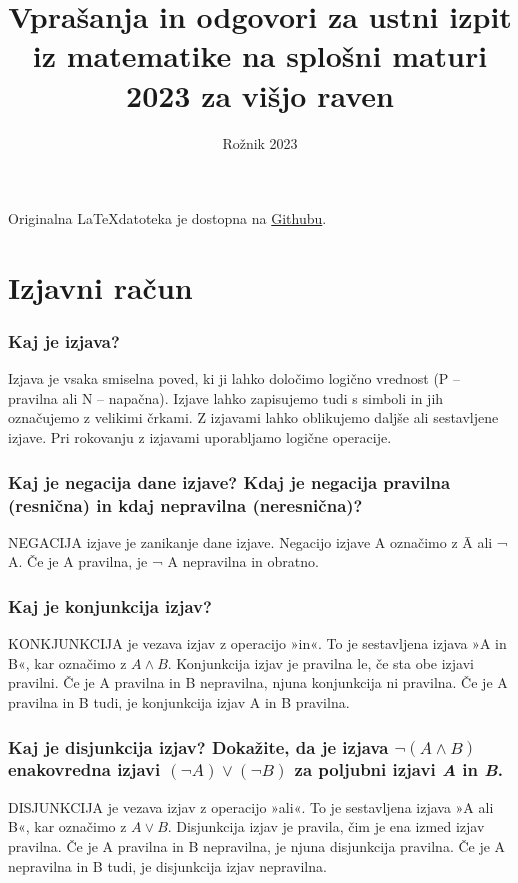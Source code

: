\documentclass{article}
\title{Vprašanja in odgovori za ustni izpit iz matematike na splošni maturi 2023 za višjo raven}
\date{Rožnik 2023}
\begin{document}
\maketitle
Originalna \LaTeX datoteka je dostopna na \href{https://github.com/ChristofferNorgaard/Ustna-matura-iz-matematike-2023}{Githubu}.
\tableofcontents

\newpage
\section{Izjavni račun}
\subsubsection*{Kaj je izjava?}
Izjava je vsaka smiselna poved, ki ji lahko določimo logično vrednost (P – pravilna ali N – napačna). Izjave lahko zapisujemo tudi s simboli in jih označujemo z velikimi
črkami. Z izjavami lahko oblikujemo daljše ali sestavljene izjave. Pri rokovanju z izjavami uporabljamo logične operacije.

\subsubsection*{Kaj je negacija dane izjave? Kdaj je negacija pravilna (resnična) in kdaj nepravilna (neresnična)?}
NEGACIJA izjave je zanikanje dane izjave. Negacijo izjave A označimo z Ā ali ¬ A.
Če je A pravilna, je ¬ A nepravilna in obratno.

\subsubsection*{Kaj je konjunkcija izjav?}
KONKJUNKCIJA je vezava izjav z operacijo »in«. To je sestavljena izjava »A in B«, kar
označimo z $A \land B$. Konjunkcija izjav je pravilna le, če sta obe izjavi pravilni.
Če je A pravilna in B nepravilna, njuna konjunkcija ni pravilna. Če je A pravilna in B tudi, je
konjunkcija izjav A in B pravilna.

\subsubsection*{Kaj je disjunkcija izjav? Dokažite, da je izjava $\neg (A \land B)$ enakovredna izjavi $(\neg A) \lor (\neg B)$ za poljubni izjavi \emph{A} in \emph{B}.}

DISJUNKCIJA je vezava izjav z operacijo »ali«. To je sestavljena izjava »A ali B«, kar označimo z $A \lor B$. Disjunkcija izjav je pravila, čim je ena izmed izjav pravilna.
Če je A pravilna in B nepravilna, je njuna disjunkcija pravilna. Če je A nepravilna in B tudi, je
disjunkcija izjav nepravilna.
\end{document}
